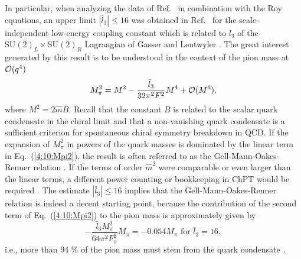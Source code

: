 \documentclass[twoside,12pt]{article}
\begin{document}
   In particular, when analyzing the data of Ref.\ \cite{Pislak:2001bf:3}
in combination with the Roy equations, an upper limit $|\bar{l}_3|\leq 16$
was obtained in Ref.\ \cite{Colangelo:2001sp} for the
scale-independent low-energy coupling constant which is related to
$l_3$ of the $\mbox{SU}(2)_L\times\mbox{SU}(2)_R$ Lagrangian of
Gasser and Leutwyler \cite{Gasser:1983yg}.
   The great interest generated by this result is to be understood in
the context of the pion mass at ${\cal O}(q^4)$
\begin{equation}
\label{4:10:Mpi2}
M_\pi^2=M^2-\frac{\bar{l}_3}{32\pi^2 F^2} M^4+ {\cal O}(M^6),
\end{equation}
   where $M^2=2\hat m B$. Recall that the constant $B$ is related
to the scalar quark condensate in the chiral limit
and that a non-vanishing quark condensate is a sufficient criterion
for spontaneous chiral symmetry breakdown in QCD.
   If the expansion of $M_\pi^2$ in powers of the quark masses is dominated
by the linear term in Eq.\ (\ref{4:10:Mpi2}), the result is often referred
to as the Gell-Mann-Oakes-Renner relation \cite{Gell-Mann:rz:3}.
   If the terms of order $\hat m^2$ were comparable or even larger than the linear
terms, a different power counting or bookkeeping
in ChPT would be required \cite{Knecht:1995tr:3}.
   The estimate $|\bar{l}_3|\leq 16$ implies that the
Gell-Mann-Oakes-Renner relation is indeed a decent starting
point, because the contribution of the second term of Eq.\ (\ref{4:10:Mpi2})
to the pion mass is approximately given by
\begin{displaymath}
-\frac{\bar{l}_3 M_\pi^2}{64\pi^2 F_\pi^2} M_\pi
=-0.054 M_\pi\,\,\mbox{for}\,\, \bar{l}_3=16,
\end{displaymath}
i.e., more than 94 \% of the pion mass must stem from the quark
condensate \cite{Colangelo:2001sp}.
\end{document}
